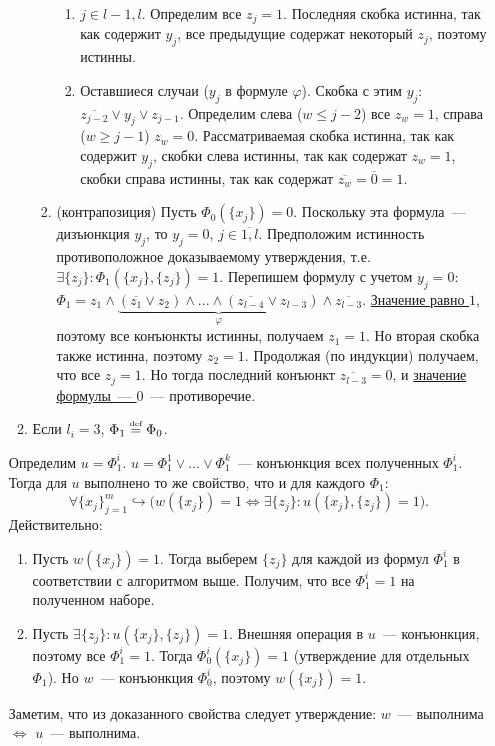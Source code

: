 \documentclass[a4paper]{article}
\def\eqdef{\overset{\mbox{\tiny def}}{=}}
\begin{document}
\begin{enumerate}
\begin{enumerate}
\begin{enumerate}
\begin{enumerate}
\item $j\in{l-1,l}$. Определим все $z_j=1$. Последняя скобка истинна, так как содержит $y_j$, все предыдущие содержат некоторый $z_j$, поэтому истинны.
\item Оставшиеся случаи ($y_j$ в формуле $\varphi$). Скобка с этим $y_j$: $\overline{z_{j-2}}\vee y_j\vee z_{j-1}$. Определим слева ($w\leqslant j-2$) все $z_w=1$, справа ($w\geqslant j-1$) $z_w=0$. Рассматриваемая скобка истинна, так как содержит $y_j$, скобки слева истинны, так как содержат $z_w=1$, скобки справа истинны, так как содержат $\overline{z_w}=\overline{0}=1$.
\end{enumerate}
\item (контрапозиция) Пусть $\Phi_0(\{x_j\})=0$. Поскольку эта формула~--- дизъюнкция $y_j$, то $y_j=0,\,j\in\overline{1,l}$. Предположим истинность противоположное доказываемому утверждения, т.е. $\exists \{z_j\}\colon \Phi_1(\{x_j\},\{z_j\})=1$. Перепишем формулу с учетом $y_j=0$: $\Phi_1=z_1\wedge\underbrace{(\overline{z_1}\vee z_2)\wedge...\wedge(\overline{z_{l-4}}\vee z_{l-3})}_{\varphi}\wedge \overline{z_{l-3}}$. \underline{Значение равно $1$}, поэтому все конъюнкты истинны, получаем $z_1=1$. Но вторая скобка также истинна, поэтому $z_2=1$. Продолжая (по индукции) получаем, что все $z_j=1$. Но тогда последний конъюнкт $\overline{z_{l-3}}=0$, и \underline{значение формулы~--- $0$}~--- противоречие.
\end{enumerate}
\item Если $l_i=3$, $\Phi_1\eqdef \Phi_0$.
\end{enumerate}
Определим $u=\Phi^i_1$. $u=\Phi^1_1\vee...\vee\Phi^k_1$~--- конъюнкция всех полученных $\Phi^i_1$. Тогда для $u$ выполнено то же свойство, что и для каждого $\Phi_1$:
$$\forall\{x_j\}_{j=1}^m\hookrightarrow\big(w(\{x_j\})=1\Leftrightarrow \exists \{z_j\}\colon u(\{x_j\},\{z_j\})=1\big).$$
Действительно:\begin{enumerate}
\item Пусть $w(\{x_j\})=1$. Тогда выберем $\{z_j\}$ для каждой из формул $\Phi^i_1$ в соответствии с алгоритмом выше. Получим, что все $\Phi^i_1=1$ на полученном наборе.
\item Пусть $\exists \{z_j\}\colon u(\{x_j\},\{z_j\})=1$. Внешняя операция в $u$~--- конъюнкция, поэтому все $\Phi^i_1=1$. Тогда $\Phi^i_0(\{x_j\})=1$ (утверждение для отдельных $\Phi_1$). Но $w$~--- конъюнкция $\Phi^i_0$, поэтому $w(\{x_j\})=1$.
\end{enumerate}
Заметим, что из доказанного свойства следует утверждение: $w$~--- выполнима $\Leftrightarrow$ $u$~--- выполнима.

\end{enumerate}
\end{document}
